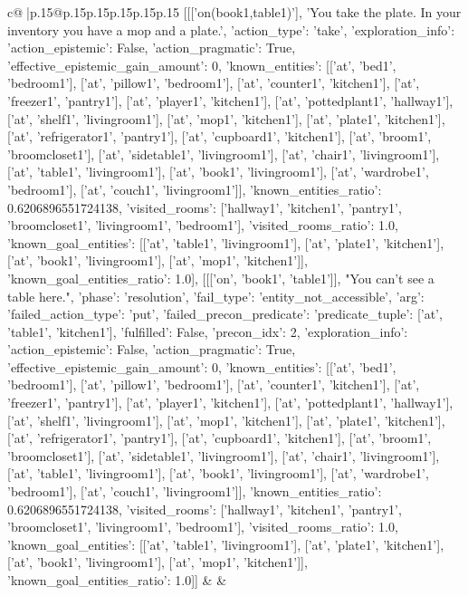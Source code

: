 \documentclass{article}
\begin{document}
{\begin{supertabular}{c@{$\;$}|p{.15\linewidth}@{}p{.15\linewidth}p{.15\linewidth}p{.15\linewidth}p{.15\linewidth}p{.15\linewidth}}
{{{	 [[['on(book1,table1)'], 'You take the plate. In your inventory you have a mop and a plate.', {'action_type': 'take', 'exploration_info': {'action_epistemic': False, 'action_pragmatic': True, 'effective_epistemic_gain_amount': 0, 'known_entities': [['at', 'bed1', 'bedroom1'], ['at', 'pillow1', 'bedroom1'], ['at', 'counter1', 'kitchen1'], ['at', 'freezer1', 'pantry1'], ['at', 'player1', 'kitchen1'], ['at', 'pottedplant1', 'hallway1'], ['at', 'shelf1', 'livingroom1'], ['at', 'mop1', 'kitchen1'], ['at', 'plate1', 'kitchen1'], ['at', 'refrigerator1', 'pantry1'], ['at', 'cupboard1', 'kitchen1'], ['at', 'broom1', 'broomcloset1'], ['at', 'sidetable1', 'livingroom1'], ['at', 'chair1', 'livingroom1'], ['at', 'table1', 'livingroom1'], ['at', 'book1', 'livingroom1'], ['at', 'wardrobe1', 'bedroom1'], ['at', 'couch1', 'livingroom1']], 'known_entities_ratio': 0.6206896551724138, 'visited_rooms': ['hallway1', 'kitchen1', 'pantry1', 'broomcloset1', 'livingroom1', 'bedroom1'], 'visited_rooms_ratio': 1.0, 'known_goal_entities': [['at', 'table1', 'livingroom1'], ['at', 'plate1', 'kitchen1'], ['at', 'book1', 'livingroom1'], ['at', 'mop1', 'kitchen1']], 'known_goal_entities_ratio': 1.0}}], [[['on', 'book1', 'table1']], "You can't see a table here.", {'phase': 'resolution', 'fail_type': 'entity_not_accessible', 'arg': {'failed_action_type': 'put', 'failed_precon_predicate': {'predicate_tuple': ['at', 'table1', 'kitchen1'], 'fulfilled': False, 'precon_idx': 2}}, 'exploration_info': {'action_epistemic': False, 'action_pragmatic': True, 'effective_epistemic_gain_amount': 0, 'known_entities': [['at', 'bed1', 'bedroom1'], ['at', 'pillow1', 'bedroom1'], ['at', 'counter1', 'kitchen1'], ['at', 'freezer1', 'pantry1'], ['at', 'player1', 'kitchen1'], ['at', 'pottedplant1', 'hallway1'], ['at', 'shelf1', 'livingroom1'], ['at', 'mop1', 'kitchen1'], ['at', 'plate1', 'kitchen1'], ['at', 'refrigerator1', 'pantry1'], ['at', 'cupboard1', 'kitchen1'], ['at', 'broom1', 'broomcloset1'], ['at', 'sidetable1', 'livingroom1'], ['at', 'chair1', 'livingroom1'], ['at', 'table1', 'livingroom1'], ['at', 'book1', 'livingroom1'], ['at', 'wardrobe1', 'bedroom1'], ['at', 'couch1', 'livingroom1']], 'known_entities_ratio': 0.6206896551724138, 'visited_rooms': ['hallway1', 'kitchen1', 'pantry1', 'broomcloset1', 'livingroom1', 'bedroom1'], 'visited_rooms_ratio': 1.0, 'known_goal_entities': [['at', 'table1', 'livingroom1'], ['at', 'plate1', 'kitchen1'], ['at', 'book1', 'livingroom1'], ['at', 'mop1', 'kitchen1']], 'known_goal_entities_ratio': 1.0}}]] 
	  } 
	   } 
	   } 
	 & & \\ 
 


\end{supertabular}}
\end{document}

